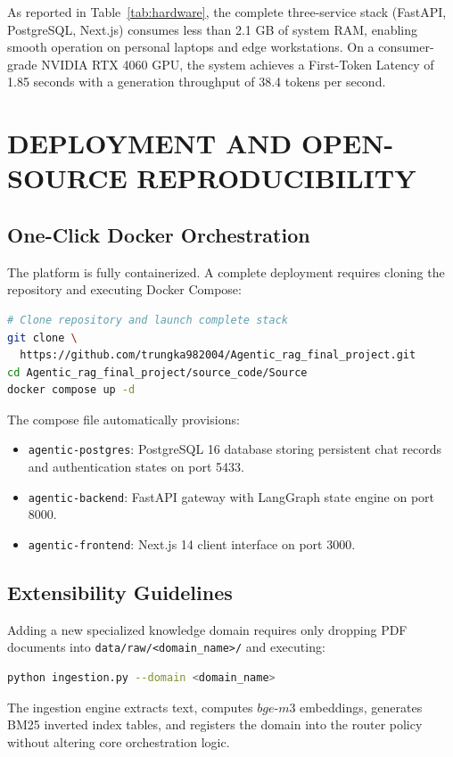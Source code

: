 \documentclass[conference]{IEEEtran}
\begin{document}
As reported in Table~\ref{tab:hardware}, the complete three-service stack (FastAPI, PostgreSQL, Next.js) consumes less than 2.1 GB of system RAM, enabling smooth operation on personal laptops and edge workstations. On a consumer-grade NVIDIA RTX 4060 GPU, the system achieves a First-Token Latency of 1.85 seconds with a generation throughput of 38.4 tokens per second.

\section{DEPLOYMENT AND OPEN-SOURCE REPRODUCIBILITY}

\subsection{One-Click Docker Orchestration}
The platform is fully containerized. A complete deployment requires cloning the repository and executing Docker Compose:
\begin{lstlisting}[language=bash]
# Clone repository and launch complete stack
git clone \
  https://github.com/trungka982004/Agentic_rag_final_project.git
cd Agentic_rag_final_project/source_code/Source
docker compose up -d
\end{lstlisting}
The compose file automatically provisions:
\begin{itemize}
    \item \texttt{agentic-postgres}: PostgreSQL 16 database storing persistent chat records and authentication states on port 5433.
    \item \texttt{agentic-backend}: FastAPI gateway with LangGraph state engine on port 8000.
    \item \texttt{agentic-frontend}: Next.js 14 client interface on port 3000.
\end{itemize}

\subsection{Extensibility Guidelines}
Adding a new specialized knowledge domain requires only dropping PDF documents into \texttt{data/raw/<domain\_name>/} and executing:
\begin{lstlisting}[language=bash]
python ingestion.py --domain <domain_name>
\end{lstlisting}
The ingestion engine extracts text, computes $bge\text{-}m3$ embeddings, generates BM25 inverted index tables, and registers the domain into the router policy without altering core orchestration logic.
\end{document}
